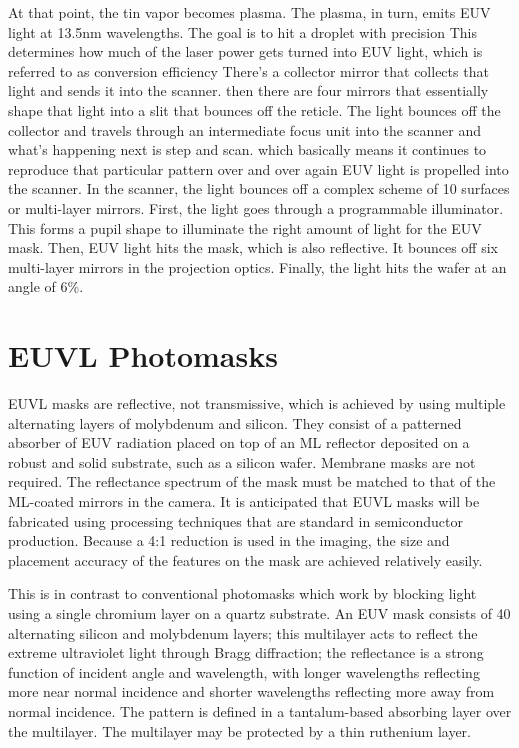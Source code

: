 \documentclass[12pt,a4paper]{report}
\begin{document}
At that point, the tin vapor becomes plasma. 
The plasma, in turn, emits EUV light at 13.5nm 
wavelengths. The goal is to hit a droplet with precision
This determines how much of the laser power 
gets turned into EUV light, 
which is referred to as conversion efficiency
There's a collector mirror that collects that light
and sends it into the scanner. then there are 
four mirrors that essentially shape that light 
into a slit that bounces off the reticle.
The light bounces off the collector and travels 
through an intermediate focus unit into the scanner
and what's happening next is step and scan. which 
basically means it continues to reproduce that 
particular pattern over and over again
EUV light is propelled into the scanner. In the 
scanner, the light bounces off a complex scheme 
of 10 surfaces or multi-layer mirrors. First, 
the light goes through a programmable illuminator. 
This forms a pupil shape to illuminate the right 
amount of light for the EUV mask.
Then, EUV light hits the mask, which is also 
reflective. It bounces off six multi-layer 
mirrors in the projection optics. Finally, 
the light hits the wafer at an angle of 6\%.

\section{EUVL Photomasks}
EUVL masks are reflective, not transmissive, which is 
achieved by using multiple alternating layers of 
molybdenum and silicon. They consist of a patterned absorber of EUV radiation placed
on top of an ML reflector deposited on a robust and solid
substrate, such as a silicon wafer. Membrane masks are
not required. The reflectance spectrum of the mask must
be matched to that of the ML-coated mirrors in the
camera. It is anticipated that EUVL masks will be
fabricated using processing techniques that are standard
in semiconductor production. Because a 4:1 reduction is
used in the imaging, the size and placement accuracy of
the features on the mask are achieved relatively easily.

This is in contrast to conventional photomasks 
which work by blocking light using a single 
chromium layer on a quartz substrate. An EUV mask 
consists of 40 alternating silicon and molybdenum 
layers; this multilayer acts to reflect the extreme 
ultraviolet light through Bragg diffraction; 
the reflectance is a strong function of incident 
angle and wavelength, with longer wavelengths 
reflecting more near normal incidence and shorter 
wavelengths reflecting more away from normal incidence. 
The pattern is defined in a tantalum-based 
absorbing layer over the multilayer.
 The multilayer 
may be protected by a thin ruthenium layer.
\end{document}
